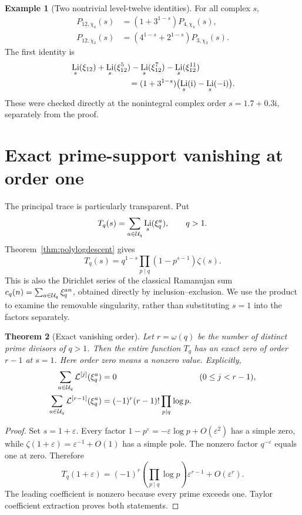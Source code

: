 \documentclass[11pt]{article}
\numberwithin{equation}{section}
\newtheorem{theorem}{Theorem}[section]
\theoremstyle{definition}\newtheorem{definition}[theorem]{Definition}
\newtheorem{example}[theorem]{Example}
\theoremstyle{remark}\newtheorem{remark}[theorem]{Remark}
\DeclareMathOperator{\Li}{Li}
\newcommand{\ii}{\mathrm i}
\newcommand{\eps}{\varepsilon}
\newcommand{\Liord}[2]{\mathcal L^{[#1]}(#2)}
\begin{document}
\begin{example}[Two nontrivial level-twelve identities]
For all complex $s$,
\begin{align}\label{eq:P12}
P_{12,\chi_4}(s)&=(1+3^{1-s})P_{4,\chi_4}(s),\\
P_{12,\chi_3}(s)&=(4^{1-s}+2^{1-s})P_{3,\chi_3}(s).
\end{align}
The first identity is
\begin{align*}
&\Li_s(\xi_{12})+\Li_s(\xi_{12}^{5})
-\Li_s(\xi_{12}^{7})-\Li_s(\xi_{12}^{11})\\
&\hspace{25mm}=(1+3^{1-s})\bigl(\Li_s(\ii)-\Li_s(-\ii)\bigr).
\end{align*}
These were checked directly at the nonintegral complex order
$s=1.7+0.3\ii$, separately from the proof.
\end{example}

\section{Exact prime-support vanishing at order one}

The principal trace is particularly transparent. Put
\begin{equation}\label{eq:Tdef}
T_q(s)=\sum_{a\in\U_q}\Li_s(\xi_q^a),\qquad q>1.
\end{equation}
Theorem~\ref{thm:polylogdescent} gives
\begin{equation}\label{eq:Tprod}
T_q(s)=q^{1-s}\prod_{p\mid q}(1-p^{s-1})\zeta(s).
\end{equation}
This is also the Dirichlet series of the classical Ramanujan sum
$c_q(n)=\sum_{a\in\mathcal U_q}\xi_q^{an}$, obtained directly by
inclusion--exclusion. We use the product to examine the removable
singularity, rather than substituting $s=1$ into the factors separately.

\begin{theorem}[Exact vanishing order]\label{thm:principalzero}
Let $r=\omega(q)$ be the number of distinct prime divisors of $q>1$.
Then the entire function $T_q$ has an exact zero of order $r-1$ at $s=1$.
Here order zero means a nonzero value. Explicitly,
\begin{align}\label{eq:zeros}
\sum_{a\in\U_q}\Liord{j}{\xi_q^a}&=0&& (0\le j<r-1),\\
\sum_{a\in\U_q}\Liord{r-1}{\xi_q^a}
&=(-1)^r(r-1)!\prod_{p\mid q}\log p.\label{eq:leading}
\end{align}
\end{theorem}
\begin{proof}
Set $s=1+\eps$. Every factor
$1-p^\eps=-\eps\log p+O(\eps^2)$ has a simple zero, while
$\zeta(1+\eps)=\eps^{-1}+O(1)$ has a simple pole.
The nonzero factor $q^{-\eps}$ equals one at zero. Therefore
\begin{equation}\label{eq:Tleading}
T_q(1+\eps)=(-1)^r\left(\prod_{p\mid q}\log p\right)
\eps^{r-1}+O(\eps^r).
\end{equation}
The leading coefficient is nonzero because every prime exceeds one.
Taylor coefficient extraction proves both statements.
\end{proof}
\end{document}
